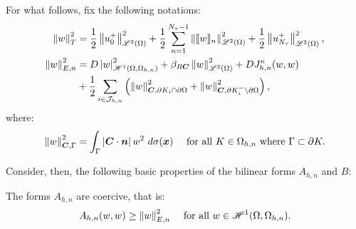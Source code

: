 For what follows, fix the following notations:
\begin{align} %
    \left\lVert w \right\rVert_{T}^2 &= \frac{1}{2} \left\lVert u_0^+ \right\rVert_{\SpaceLp{2}(\Omega)}^2 + \frac{1}{2} \sum_{n = 1}^{\nTimeIndices - 1} \left\lVert \Jump{w}_n \right\rVert_{\SpaceLp{2}(\Omega)}^2 + \frac{1}{2} \left\lVert u_{\nTimeIndices}^+ \right\rVert_{\SpaceLp{2}(\Omega)}^2, \\
    \left\lVert w \right\rVert_{E, n}^2 &= \Diffusion \left\lvert w \right\rvert_{\SpaceHk{1}(\Omega, \Omega_{h, n})}^2 + \BoundC{\Reaction \Convection} \left\lVert w \right\rVert_{\SpaceLp{2}(\Omega)}^2 + \Diffusion J^{\kappa}_{h, n}(w, w) \\
    &+ \frac{1}{2} \sum_{i \in \SpaceTimeIndices} \left( \left\lVert w \right\rVert_{\Convection, \partial K_i \cap \partial \Omega}^2 + \left\lVert w \right\rVert_{\Convection, \partial K_i^- \setminus \partial \Omega}^2 \right), \notag
\end{align}
where:
\begin{align}
    \left\lVert w \right\rVert_{\bm{C}, \Gamma}^2 &= \int_{\Gamma} \left\lvert \bm{C} \cdot \bm{n} \right\rvert w^2 ~ d \sigma(\bm{x}) &\text{ for all } K \in \Omega_{h, n} \text{ where } \Gamma \subset \partial K.
\end{align}

Consider, then, the following basic properties of the bilinear forms $A_{h, n}$ and $B$:

\begin{lemma}[Coercivity of $A_{h, n}$] \label{lemma:A_coercivity}
    The forms $A_{h, n}$ are coercive, that is:
    \begin{align}
        A_{h, n}(w, w) &\geq \left\lVert w \right\rVert_{E, n}^2 &\text{ for all } w \in \mathscr{H}^{1}(\Omega, \Omega_{h, n}).
    \end{align}
\end{lemma}

